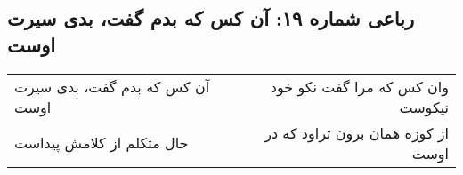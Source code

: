 \begin{center}
\section*{رباعی شماره ۱۹: آن کس که بدم گفت، بدی سیرت اوست}
\label{sec:019}
\begin{longtable}{l p{0.5cm} r}
آن کس که بدم گفت، بدی سیرت اوست
&&
وان کس که مرا گفت نکو خود نیکوست
\\
حال متکلم از کلامش پیداست
&&
از کوزه همان برون تراود که در اوست
\\
\end{longtable}
\end{center}
